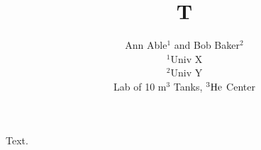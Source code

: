 \documentclass{article}
\begin{document}
\title{T}
\author{Ann Able$^{1}$ and Bob Baker$^{2}$\\ $^{1}$Univ X\\ $^{2}$Univ Y\\ Lab of 10 m$^{3}$ Tanks, ${\rm ^{3}He}$ Center}
\maketitle
Text.
\end{document}
